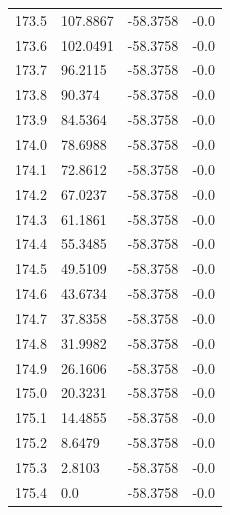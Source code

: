 \begin{table}[H]
\begin{tabular}{llll}
173.5 & 107.8867 & -58.3758 & -0.0 \\
173.6 & 102.0491 & -58.3758 & -0.0 \\
173.7 & 96.2115 & -58.3758 & -0.0 \\
173.8 & 90.374 & -58.3758 & -0.0 \\
173.9 & 84.5364 & -58.3758 & -0.0 \\
174.0 & 78.6988 & -58.3758 & -0.0 \\
174.1 & 72.8612 & -58.3758 & -0.0 \\
174.2 & 67.0237 & -58.3758 & -0.0 \\
174.3 & 61.1861 & -58.3758 & -0.0 \\
174.4 & 55.3485 & -58.3758 & -0.0 \\
174.5 & 49.5109 & -58.3758 & -0.0 \\
174.6 & 43.6734 & -58.3758 & -0.0 \\
174.7 & 37.8358 & -58.3758 & -0.0 \\
174.8 & 31.9982 & -58.3758 & -0.0 \\
174.9 & 26.1606 & -58.3758 & -0.0 \\
175.0 & 20.3231 & -58.3758 & -0.0 \\
175.1 & 14.4855 & -58.3758 & -0.0 \\
175.2 & 8.6479 & -58.3758 & -0.0 \\
175.3 & 2.8103 & -58.3758 & -0.0 \\
175.4 & 0.0 & -58.3758 & -0.0 \\
\bottomrule
\end{tabular}

\end{table}
